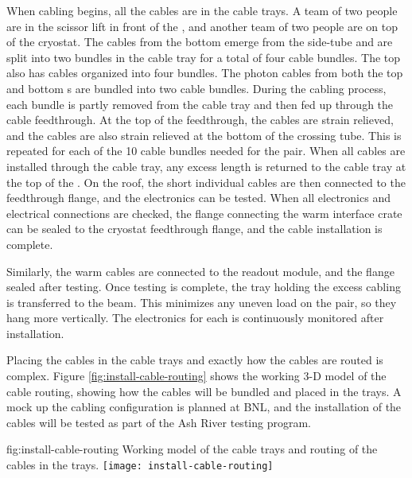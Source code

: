 When cabling begins, all the cables are in the cable trays. 
A team of two people are in the scissor lift in front of the , and another team of two people are on top of the cryostat. 
The  cables from the bottom  emerge from the  side-tube and are split into two bundles in the cable tray for a total of four cable bundles. 
The top  also has  cables organized into four bundles. 
The photon cables from both the top and bottom s are bundled into two cable bundles.
During the cabling process, each bundle is partly removed from the cable tray and then fed up through the cable feedthrough. 
At the top of the feedthrough, the cables are strain relieved, and the cables are also strain relieved at the bottom of the crossing tube.
This is repeated for each of the 10 cable bundles needed for the  pair. 
When all cables are installed through the cable tray, any excess length is returned to the cable tray at the top of the . 
On the roof, the short individual cables are then connected to the feedthrough flange, and the electronics can be tested. When all electronics and electrical connections are checked, the flange connecting the warm interface crate can be sealed to the cryostat feedthrough flange, and the cable installation is complete. 

Similarly, the  warm cables are connected to the readout module, and the flange sealed after testing.  Once testing is complete, the tray holding the excess cabling is transferred to the  beam.  This minimizes any uneven load on the  pair, so they hang more vertically.   
The electronics for each  is continuously monitored after installation. 

Placing the cables in the cable trays and exactly how the cables are routed is complex. Figure \ref{fig:install-cable-routing} shows the working 3-D model of the cable routing, showing how the cables will be bundled and placed in the trays. A mock up the cabling configuration is planned at BNL, and the installation of the cables will be tested as part of the Ash River testing program.

\begin{dunefigure}{fig:install-cable-routing}
  {Working model of the cable trays and routing of the cables in the trays.}
\texttt{[image: install-cable-routing]}
\end{dunefigure}


